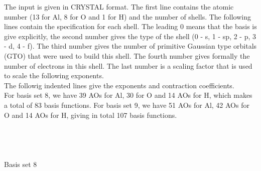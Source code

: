 \documentclass[11pt,DIV=13,BCOR=5mm,a4paper,headinclude]{scrbook}
\begin{document}
The input is given in CRYSTAL format.
The first line contains the atomic number (13 for Al, 8 for O and 1 for H) and the number of shells.
The following lines contain the specification for each shell.
The leading 0 means that the basis is give explicitly, the second number gives the type of the shell (0 - s, 1 - sp, 2 - p, 3 - d, 4 - f).
The third number gives the number of primitive Gaussian type orbitals (GTO) that were used to build this shell.
The fourth number gives formally the number of electrons in this shell.
The last number is a scaling factor that is used to scale the following exponents.
\\
The followig indented lines give the exponents and contraction coefficients.\\
For basis set 8, we have 39 AOs for Al, 30 for O and 14 AOs for H, which makes a total of 83 basis functions.
For basis set 9, we have 51 AOs for Al, 42 AOs for O and 14 AOs for H, giving in total 107 basis functions.
\\\\\\\\\\
Basis set 8
\end{document}
